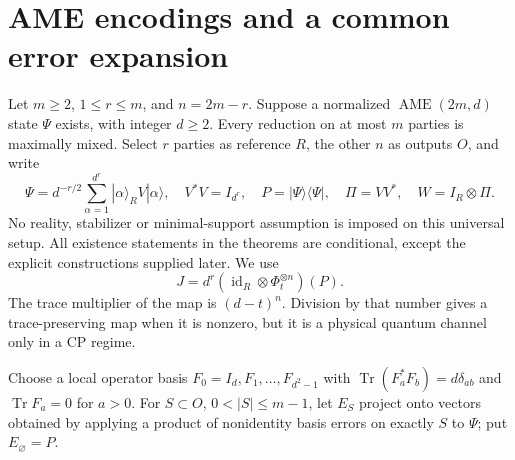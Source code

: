 \documentclass[11pt,a4paper]{article}
\newcommand{\Tr}{\operatorname{Tr}}
\newcommand{\id}{\operatorname{id}}
\begin{document}
\section{AME encodings and a common error expansion}
Let \(m\ge2\), \(1\le r\le m\), and \(n=2m-r\). Suppose a normalized \(\operatorname{AME}(2m,d)\) state \(\Psi\) exists, with integer \(d\ge2\). Every reduction on at most \(m\) parties is maximally mixed. Select \(r\) parties as reference \(R\), the other \(n\) as outputs \(O\), and write
\begin{equation}\label{eq:enc}
 \Psi=d^{-r/2}\sum_{\alpha=1}^{d^r}|\alpha\rangle_R V|\alpha\rangle,
 \quad V^*V=I_{d^r},\quad P=|\Psi\rangle\langle\Psi|,
 \quad \Pi=VV^*,\quad W=I_R\otimes\Pi .
\end{equation}
No reality, stabilizer or minimal-support assumption is imposed on this universal setup. All existence statements in the theorems are conditional, except the explicit constructions supplied later. We use
\begin{equation}\label{eq:choi}
 J=d^r(\id_R\otimes\Phi_t^{\otimes n})(P).
\end{equation}
The trace multiplier of the map is \((d-t)^n\). Division by that number gives a trace-preserving map when it is nonzero, but it is a physical quantum channel only in a CP regime.

Choose a local operator basis \(F_0=I_d,F_1,\ldots,F_{d^2-1}\) with
\(\Tr(F_a^*F_b)=d\delta_{ab}\) and \(\Tr F_a=0\) for \(a>0\).
For \(S\subset O\), \(0<|S|\le m-1\), let \(E_S\) project onto vectors obtained by applying a product of nonidentity basis errors on exactly \(S\) to \(\Psi\); put \(E_\varnothing=P\).
\end{document}
